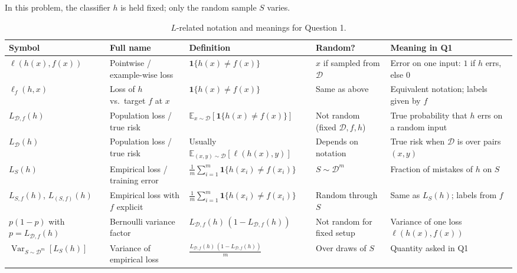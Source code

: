 \documentclass[11pt,a4paper]{article}
\theoremstyle{definition}
\begin{document}
\begin{note}
    In this problem, the classifier $h$ is held fixed; only the random sample $S$ varies.
\end{note}
\begin{table}[ht]
    \centering
    \caption{\(L\)-related notation and meanings for Question 1.}
    \label{tab:L-notation}
    {\footnotesize
    \setlength{\tabcolsep}{3pt}
    \renewcommand{\arraystretch}{1.2}
    \begin{tabularx}{\linewidth}{|
      >{\raggedright\arraybackslash}p{2.35cm}|
      >{\raggedright\arraybackslash}X|
      >{\raggedright\arraybackslash}p{3.1cm}|
      >{\raggedright\arraybackslash}X|
      >{\raggedright\arraybackslash}X|
    }
    \hline
    \textbf{Symbol} & \textbf{Full name} & \textbf{Definition} & \textbf{Random?} & \textbf{Meaning in Q1} \\
    \hline
    $\ell(h(x),f(x))$
      & Pointwise / example-wise loss
      & $\mathbf{1}\{h(x)\neq f(x)\}$
      & $x$ if sampled from $\mathcal{D}$
      & Error on one input: $1$ if $h$ errs, else $0$ \\
    \hline
    $\ell_f(h,x)$
      & Loss of $h$ vs.\ target $f$ at $x$
      & $\mathbf{1}\{h(x)\neq f(x)\}$
      & Same as above
      & Equivalent notation; labels given by $f$ \\
    \hline
    $L_{\mathcal{D},f}(h)$
      & Population loss / true risk
      & $\mathbb{E}_{x\sim\mathcal{D}}[\mathbf{1}\{h(x)\neq f(x)\}]$
      & Not random (fixed $\mathcal{D},f,h$)
      & True probability that $h$ errs on a random input \\
    \hline
    $L_{\mathcal{D}}(h)$
      & Population loss / true risk
      & Usually $\mathbb{E}_{(x,y)\sim\mathcal{D}}[\ell(h(x),y)]$
      & Depends on notation
      & True risk when $\mathcal{D}$ is over pairs $(x,y)$ \\
    \hline
    $L_S(h)$
      & Empirical loss / training error
      & $\displaystyle\frac{1}{m}\sum_{i=1}^m \mathbf{1}\{h(x_i)\neq f(x_i)\}$
      & $S\sim\mathcal{D}^m$
      & Fraction of mistakes of $h$ on $S$ \\
    \hline
    $L_{S,f}(h)$, $L_{(S,f)}(h)$
      & Empirical loss with $f$ explicit
      & $\displaystyle\frac{1}{m}\sum_{i=1}^m \mathbf{1}\{h(x_i)\neq f(x_i)\}$
      & Random through $S$
      & Same as $L_S(h)$; labels from $f$ \\
    \hline
    $p(1-p)$ with $p=L_{\mathcal{D},f}(h)$
      & Bernoulli variance factor
      & $L_{\mathcal{D},f}(h)\,(1-L_{\mathcal{D},f}(h))$
      & Not random for fixed setup
      & Variance of one loss $\ell(h(x),f(x))$ \\
    \hline
    $\operatorname{Var}_{S\sim\mathcal{D}^m}[L_S(h)]$
      & Variance of empirical loss
      & $\displaystyle\frac{L_{\mathcal{D},f}(h)\,(1-L_{\mathcal{D},f}(h))}{m}$
      & Over draws of $S$
      & Quantity asked in Q1 \\
    \hline
    \end{tabularx}
    }
\end{table}
\end{document}
